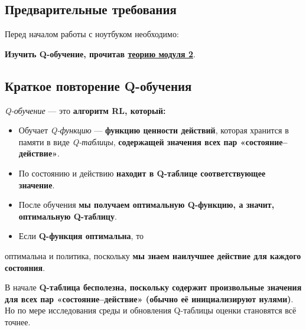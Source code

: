 \documentclass[11pt,a4paper]{article}
\begin{document}
\subsection{Предварительные требования}\label{prerequisites}

Перед началом работы с ноутбуком необходимо:

\textbf{Изучить Q-обучение, прочитав \href{https://huggingface.co/deep-rl-course/unit2/introduction}{теорию модуля 2}}.

\subsection{Краткое повторение Q-обучения}\label{a-small-recap-of-q-learning}

\emph{Q-обучение} --- это \textbf{алгоритм RL, который:}

\begin{itemize}
\item
  Обучает \emph{Q-функцию} --- \textbf{функцию ценности действий}, которая хранится в памяти в виде \emph{Q-таблицы}, \textbf{содержащей значения всех пар «состояние--действие»}.
\item
  По состоянию и действию \textbf{находит в Q-таблице соответствующее значение}.
\end{itemize}


\begin{itemize}
\item
  После обучения \textbf{мы получаем оптимальную Q-функцию, а значит, оптимальную Q-таблицу}.
\item
  Если \textbf{Q-функция оптимальна}, то
\end{itemize}

оптимальна и политика, поскольку \textbf{мы знаем наилучшее действие для каждого состояния}.


В начале \textbf{Q-таблица бесполезна, поскольку содержит произвольные значения для всех пар «состояние--действие» (обычно её инициализируют нулями)}. Но по мере исследования среды и обновления Q-таблицы оценки становятся всё точнее.
\end{document}
